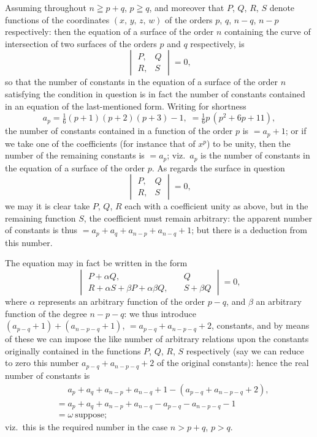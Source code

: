 \documentclass[12pt,a4paper,oneside]{book}
\theoremstyle{plain}
\theoremstyle{definition}
\theoremstyle{remark}
\begin{document}
Assuming throughout $n \geqq p+q$, $p \geqq q$, and moreover that $P$, $Q$, $R$, $S$ denote functions of the coordinates $(x,\, y,\, z,\, w)$ of the orders $p$, $q$, $n-q$, $n-p$ respectively: then the equation of a surface of the order $n$ containing the curve of intersection of two surfaces of the orders $p$ and $q$ respectively, is
\[
\begin{vmatrix} P, & Q \\ R, & S \end{vmatrix} = 0,
\]
so that the number of constants in the equation of a surface of the order $n$ satisfying the condition in question is in fact the number of constants contained in an equation of the last-mentioned form. Writing for shortness
\[
a_p = \tfrac{1}{6}(p+1)(p+2)(p+3)-1,\; = \tfrac{1}{6}p\,(p^2+6p+11),
\]
the number of constants contained in a function of the order $p$ is $=a_p+1$; or if we take one of the coefficients (for instance that of $x^p$) to be unity, then the number of the remaining constants is $=a_p$; viz.\ $a_p$ is the number of constants in the equation of a surface of the order $p$. As regards the surface in question
\[
\begin{vmatrix} P, & Q \\ R, & S \end{vmatrix} = 0,
\]
we may it is clear take $P$, $Q$, $R$ each with a coefficient unity as above, but in the remaining function $S$, the coefficient must remain arbitrary: the apparent number of constants is thus $=a_p+a_q+a_{n-p}+a_{n-q}+1$; but there is a deduction from this number.

The equation may in fact be written in the form
\[
\begin{vmatrix} P+\alpha Q, & Q \\ R+\alpha S+\beta P+\alpha\beta Q,\quad & S+\beta Q \end{vmatrix} = 0,
\]
where $\alpha$ represents an arbitrary function of the order $p-q$, and $\beta$ an arbitrary function of the degree $n-p-q$: we thus introduce $(a_{p-q}+1)+(a_{n-p-q}+1)$, $=a_{p-q}+a_{n-p-q}+2$, constants, and by means of these we can impose the like number of arbitrary relations upon the constants originally contained in the functions $P$, $Q$, $R$, $S$ respectively (say we can reduce to zero this number $a_{p-q}+a_{n-p-q}+2$ of the original constants): hence the real number of constants is
\begin{align*}
&\phantom{=} a_p+a_q+a_{n-p}+a_{n-q}+1-(a_{p-q}+a_{n-p-q}+2),\\
&= a_p+a_q+a_{n-p}+a_{n-q}-a_{p-q}-a_{n-p-q}-1\\
&= \omega\ \text{suppose};
\end{align*}
viz.\ this is the required number in the case $n > p+q$, $p > q$.
\end{document}
